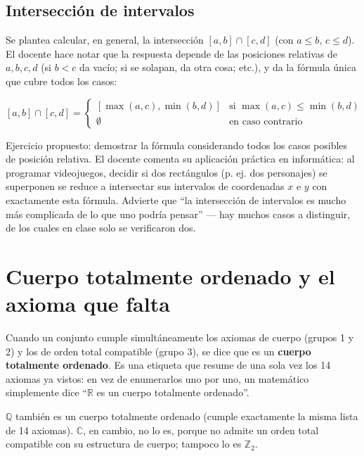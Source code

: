\documentclass[12pt,a4paper]{article}
\begin{document}
\subsection{Intersección de intervalos}

Se plantea calcular, en general, la intersección $[a,b] \cap [c,d]$ (con
$a\leq b$, $c \leq d$). El docente hace notar que la respuesta depende de
las posiciones relativas de $a,b,c,d$ (si $b < c$ da vacío; si se solapan,
da otra cosa; etc.), y da la fórmula única que cubre todos los casos:

$$
\boxed{[a,b] \cap [c,d] =
\begin{cases}
[\max(a,c), \min(b,d)] & \text{si } \max(a,c) \leq \min(b,d) \\
\emptyset & \text{en caso contrario}
\end{cases}}
$$



\begin{notebox}
Ejercicio propuesto: demostrar la fórmula considerando todos los casos
posibles de posición relativa. El docente comenta su aplicación práctica en
informática: al programar videojuegos, decidir si dos rectángulos (p. ej.
dos personajes) se superponen se reduce a intersectar sus intervalos de
coordenadas $x$ e $y$ con exactamente esta fórmula. Advierte que ``la
intersección de intervalos es mucho más complicada de lo que uno podría
pensar'' --- hay muchos casos a distinguir, de los cuales en clase solo se
verificaron dos.
\end{notebox}

\section{Cuerpo totalmente ordenado y el axioma que falta}
\label{sec:completitud}

Cuando un conjunto cumple simultáneamente los axiomas de cuerpo (grupos 1 y
2) y los de orden total compatible (grupo 3), se dice que es un
\textbf{cuerpo totalmente ordenado}. Es una etiqueta que resume de una sola
vez los 14 axiomas ya vistos: en vez de enumerarlos uno por uno, un
matemático simplemente dice ``$\mathbb{R}$ es un cuerpo totalmente
ordenado''.

$\mathbb{Q}$ también es un cuerpo totalmente ordenado (cumple exactamente
la misma lista de 14 axiomas). $\mathbb{C}$, en cambio, no lo es, porque no
admite un orden total compatible con su estructura de cuerpo; tampoco lo es
$\mathbb{Z}_2$.
\end{document}
